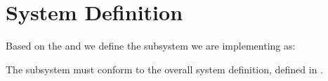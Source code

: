 \section{System Definition}
\label{sec:subSysDef}
Based on the  and  we define the subsystem we are implementing as: 

The subsystem must conform to the overall system definition, defined in .